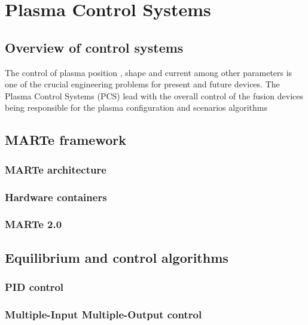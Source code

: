\chapter{Plasma Control Systems}

\section{Overview of control systems}
The control of  plasma position , shape and current among other parameters is one of the crucial engineering problems for present and future devices. The Plasma Control Systems (PCS) lead with the overall control of the fusion devices  being responsible for the  plasma configuration and scenarios algorithms 

\section{MARTe framework}
\subsection{MARTe architecture }
\subsection{Hardware containers}
\subsection{MARTe 2.0}
\section{Equilibrium and control algorithms} 
\subsection{PID control}
\subsection{Multiple-Input Multiple-Output control}